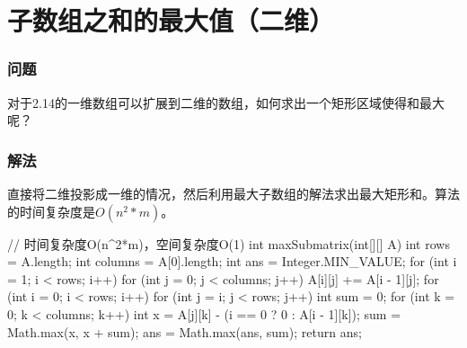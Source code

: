 \section{子数组之和的最大值（二维）} %
\label{sec:max-product}

\subsubsection{问题}
对于2.14的一维数组可以扩展到二维的数组，如何求出一个矩形区域使得和最大呢？

\subsubsection{解法}
直接将二维投影成一维的情况，然后利用最大子数组的解法求出最大矩形和。算法的时间复杂度是$O(n^2*m)$。

\begin{Code}
// 时间复杂度O(n^2*m)，空间复杂度O(1)
int maxSubmatrix(int[][] A) {
    int rows = A.length;
    int columns = A[0].length;
    int ans = Integer.MIN_VALUE;
    for (int i = 1; i < rows; i++) {
        for (int j = 0; j < columns; j++) {
            A[i][j] += A[i - 1][j];
        }
    }
    for (int i = 0; i < rows; i++) {
        for (int j = i; j < rows; j++) {
            int sum = 0;
            for (int k = 0; k < columns; k++) {
                int x = A[j][k] - (i == 0 ? 0 : A[i - 1][k]);
                sum = Math.max(x, x + sum);
                ans = Math.max(ans, sum);
            }
        }
    }
    return ans;
}
\end{Code}